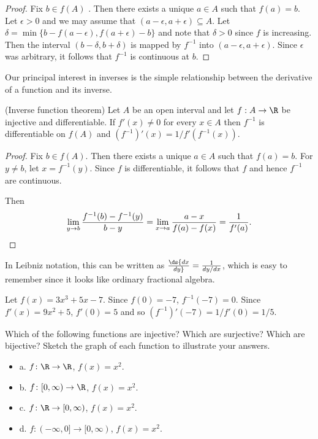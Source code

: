 \begin{theorem}
\begin{theorem}
\begin{theorem}
\begin{theorem}
\begin{proof}
Fix $b\in f(A)$ . Then there exists a unique $a\in A$ such that
$f(a) = b $. Let $\epsilon > 0 $ and we may assume that $(a-\epsilon
, a+\epsilon ) \subseteq A $. Let $\delta =\min \{ b-
f(a-\epsilon ) , f(a+\epsilon ) -b \}$ and note that
$\delta
>0 $ since $f$ is increasing.  Then the interval $(b-\delta ,
b+\delta ) $ is mapped by $f^{-1} $ into $(a-\epsilon , a+\epsilon )
$. Since $\epsilon $ was arbitrary, it follows that $f^{-1 }$ is
continuous at $b$.
\end{proof}

Our principal interest in inverses is the simple relationship between
the derivative of a function and its inverse.

\begin{theorem} (Inverse function theorem) Let $A$ be an open interval and let $f:A\to
\label{thm:inverse function theorem}
\R$ be injective and differentiable.   If $f'(x) \neq 0 $
for every $x\in A $ then $f^{-1}$ is differentiable on $f(A)$ and
$(f^{-1})'(x) = 1/f'(f^{-1}(x))$.

\begin{proof} Fix $b\in f(A)$. Then there exists a unique $a\in A$ such
that $f(a)=b$. For $y\neq b $, let $x=f^{-1} (y) $. Since $f$ is
differentiable, it follows that $f$ and hence $f^{-1}$ are
continuous.

Then
$$\lim_{y\to b}{f^{-1} (b) - f^{-1} (y)\over b-y}
   = \lim_{x\to a}{a-x\over f(a) -f(x)} ={1\over f'(a)}.$$
\end{proof}

In Leibniz notation, this can be written as
$\ds{dx\over dy} ={1\over dy/dx}$, which is easy to remember since it looks
like ordinary fractional algebra.

\begin{example} Let $f(x) = 3x^3 + 5x - 7$. Since $f(0)=-7$, 
$f^{-1} (-7) =0$. Since $f'(x) = 9x^2 + 5$, $f'(0)=5$ and
so $(f^{-1})' (-7)=1/f'(0)=1/5$.
\end{example}

\begin{exercises}

\exercise Which of the following functions are injective? Which
are surjective? Which are bijective? Sketch the graph of each
function to illustrate your answers.

\begin{itemize} %

\item{a.} $f\colon \R\to\R$, $f(x)=x^2$.
\item{b.} $f\colon [0, \infty )\to\R$, $f(x)=x^2$.
\item{c.} $f\colon \R\to[0, \infty )$, $f(x)=x^2$.
\item{d.} $f\colon (-\infty,0]\to[0, \infty )$, $f(x)=x^2$.


\end{itemize}
\end{exercises}
\end{theorem}
\end{theorem}
\end{theorem}
\end{theorem}
\end{theorem}
